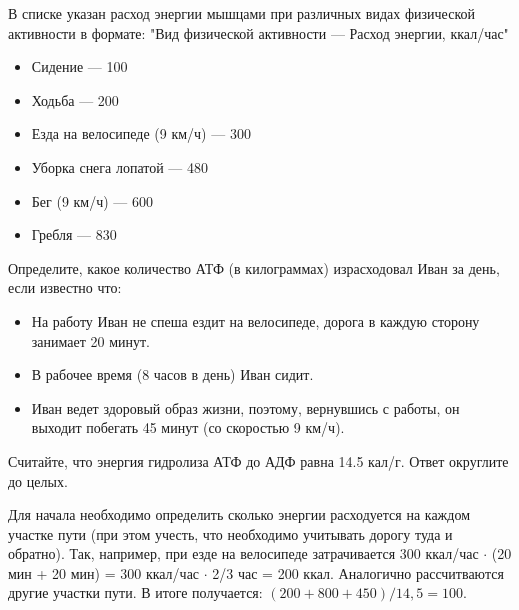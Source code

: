 
В списке указан расход энергии мышцами при различных
видах физической активности в формате: "Вид физической активности — Расход энергии, ккал/час"

\begin{itemize}
    \item Сидение — 100
    \item Ходьба — 200
    \item Езда на велосипеде (9 км/ч) — 300
    \item Уборка снега лопатой — 480
    \item Бег (9 км/ч) — 600
    \item Гребля — 830
\end{itemize}
 
Определите, какое количество АТФ
(в килограммах) израсходовал Иван за день, если известно что:

\begin{itemize}
    \item На работу Иван не спеша ездит на велосипеде, дорога в каждую сторону занимает 20 минут.
    \item В рабочее время (8 часов в день) Иван сидит.
    \item Иван ведет здоровый образ жизни, поэтому, вернувшись с работы, он выходит побегать 45 минут (со скоростью 9 км/ч).
\end{itemize}

Считайте, что энергия гидролиза
АТФ до АДФ равна 14.5 кал/г. Ответ округлите до целых.

\solutionSection

Для начала необходимо определить сколько энергии расходуется на каждом участке пути (при этом учесть, что необходимо учитывать дорогу туда и обратно). Так, например, при езде на велосипеде затрачивается 300 ккал/час $\cdot$ (20 мин + 20 мин) = 300 ккал/час $\cdot$ 2/3 час = 200 ккал. Аналогично рассчитваются другие участки пути. В итоге получается:
 $(200 + 800 + 450) / 14,5 = 100.$

